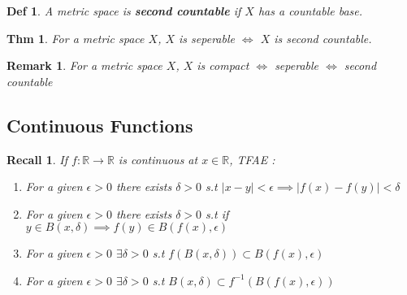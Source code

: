 \documentclass[paper=a4, fontsize=11pt]{scrartcl}
\newtheorem{theorem}{Thm}
\newtheorem{definition}{Def}
\newtheorem*{remark}{Remark}
\newtheorem*{recall}{Recall}
\begin{document}
\vspace{0.15in}

\begin{definition}
	A metric space is \textbf{second countable} if $X$ has a countable base.
\end{definition}

\vspace{0.15in}

\begin{theorem}
	For a metric space $X$, $X$ is seperable $\iff$ $X$ is second countable.
\end{theorem}

\vspace{0.15in}

\begin{remark}
	For a metric space $X$, $X$ is compact $\iff$ seperable $\iff$ second countable
\end{remark}

\vspace{0.15in}
\subsection{Continuous Functions}
\vspace{0.15in}

\begin{recall}
	If $f:\mathbb{R} \to \mathbb{R}$ is continuous at $x\in\mathbb{R}$, TFAE : 
	\begin{enumerate}[label=\arabic*)]
		\item For a given $\epsilon>0$ there exists $\delta > 0$ s.t $|x-y|<\epsilon \implies |f(x)-f(y)|<\delta$
		\item For a given $\epsilon>0$ there exists $\delta > 0$ s.t if $y \in B(x,\delta) \implies f(y) \in B(f(x),\epsilon)$
		\item For a given $\epsilon>0$  $\exists \delta > 0$ s.t $f(B(x,\delta))\subset B(f(x),\epsilon)$
		\item For a given $\epsilon>0$ $\exists \delta > 0$ s.t $B(x,\delta)\subset f^{-1}(B(f(x),\epsilon))$
	\end{enumerate}
\end{recall}

\vspace{0.15in}
\end{document}
